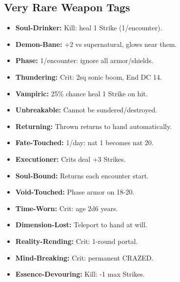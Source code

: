 \documentclass[10pt,twoside]{article}
\begin{document}
\begin{multicols}{2}
\subsection{Very Rare Weapon Tags}
\begin{itemize}[leftmargin=0.2cm, itemsep=0.02cm, parsep=0pt]
\item \textcolor{veryrarecolor}{\textbf{Soul-Drinker:}} Kill: heal 1 Strike (1/encounter).
\item \textcolor{veryrarecolor}{\textbf{Demon-Bane:}} +2 vs supernatural, glows near them.
\item \textcolor{veryrarecolor}{\textbf{Phase:}} 1/encounter: ignore all armor/shields.
\item \textcolor{veryrarecolor}{\textbf{Thundering:}} Crit: 2sq sonic boom, End DC 14.
\item \textcolor{veryrarecolor}{\textbf{Vampiric:}} 25\% chance heal 1 Strike on hit.
\item \textcolor{veryrarecolor}{\textbf{Unbreakable:}} Cannot be sundered/destroyed.
\item \textcolor{veryrarecolor}{\textbf{Returning:}} Thrown returns to hand automatically.
\item \textcolor{veryrarecolor}{\textbf{Fate-Touched:}} 1/day: nat 1 becomes nat 20.
\item \textcolor{veryrarecolor}{\textbf{Executioner:}} Crits deal +3 Strikes.
\item \textcolor{veryrarecolor}{\textbf{Soul-Bound:}} Returns each encounter start.
\item \textcolor{veryrarecolor}{\textbf{Void-Touched:}} Phase armor on 18-20.
\item \textcolor{veryrarecolor}{\textbf{Time-Worn:}} Crit: age 2d6 years.
\item \textcolor{veryrarecolor}{\textbf{Dimension-Lost:}} Teleport to hand at will.
\item \textcolor{veryrarecolor}{\textbf{Reality-Rending:}} Crit: 1-round portal.
\item \textcolor{veryrarecolor}{\textbf{Mind-Breaking:}} Crit: permanent CRAZED.
\item \textcolor{veryrarecolor}{\textbf{Essence-Devouring:}} Kill: -1 max Strikes.
\end{itemize}

\vspace{0.3cm}


\end{multicols}
\end{document}
